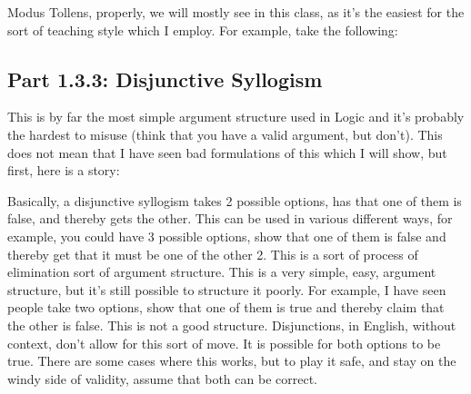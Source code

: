 Modus Tollens, properly, we will mostly see in this class, as it's the easiest for the sort of teaching style which I employ. For example, take the following:

    
\subsection{Part 1.3.3: Disjunctive Syllogism}
\label{s:p1.3.3}

This is by far the most simple argument structure used in Logic and it's probably the hardest to misuse (think that you have a valid argument, but don't). This does not mean that I have seen bad formulations of this which I will show, but first, here is a story:

Basically, a disjunctive syllogism takes 2 possible options, has that one of them is false, and thereby gets the other. This can be used in various different ways, for example, you could have 3 possible options, show that one of them is false and thereby get that it must be one of the other 2. This is a sort of process of elimination sort of argument structure. This is a very simple, easy, argument structure, but it's still possible to structure it poorly. For example, I have seen people take two options, show that one of them is true and thereby claim that the other is false. This is not a good structure. Disjunctions, in English, without context, don't allow for this sort of move. It is possible for both options to be true. There are some cases where this works, but to play it safe, and stay on the windy side of validity, assume that both can be correct. 

